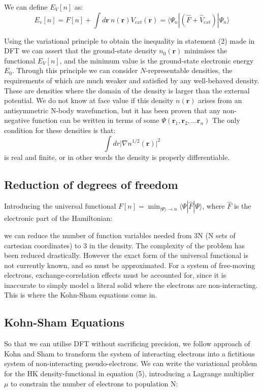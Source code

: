\documentclass[10pt]{article}
\begin{document}
We can define $E_V[n]$ as:
\begin{equation}
	E_v[n] = F[n]+\int d\mathbf{r} \ n(\mathbf{r})V_{ext}(\mathbf{r}) = \langle\Psi_n|(\hat{F}+\hat{V}_{ext})|\Psi_n\rangle
\end{equation}

Using the variational principle to obtain the inequality in statement (2) made in DFT \cite{haynes} we can assert that the ground-state density $n_0(\mathbf{r})$ minimises the functional $E_V[n]$, and the minimum value is the ground-state electronic energy $E_0$. Through this principle we can consider $N$-representable densities, the requirements of which are much weaker and satisfied by any well-behaved density. These are densities where the domain of the density is larger than the external potential. We do not know at face value if this density $n(\mathbf{r})$ arises from an antisymmetric N-body wavefunction, but it has been proven that any non-negative function can be written in terms of some $\Psi(\mathbf{r}_1,\mathbf{r}_2,...\mathbf{r}_n)$ \cite{gilbert1975hohenberg} The only condition for these densities is that: $$\int dr \biggr|\nabla n^{1/2}(\mathbf{r})\biggr|^2$$ is real and finite, or in other words the density is properly differentiable.

\subsection{Reduction of degrees of freedom}

Introducing the universal functional $F[n] = \min_{|\Psi\rangle\rightarrow n}\langle\Psi|\hat{F}|\Psi\rangle$, where $\hat{F}$ is the electronic part of the Hamiltonian:

we can reduce the number of function variables needed from 3N (N sets of cartesian coordinates) to 3 in the density. The complexity of the problem has been reduced drastically. However the exact form of the universal functional is not currently known, and so must be approximated. For a system of free-moving electrons, exchange-correlation effects must be accounted for, since it is inaccurate to simply model a literal solid where the electrons are non-interacting. This is where the Kohn-Sham equations come in.

\subsection{Kohn-Sham Equations}

So that we can utilise DFT without sacrificing precision, we follow approach of Kohn and Sham \cite{kohn1965self} to transform the system of interacting electrons into a fictitious system of non-interacting pseudo-electrons. We can write the variational problem for the HK density-functional in equation (5), introducing a Lagrange multiplier $\mu$ to constrain the number of electrons to population N:
\end{document}

